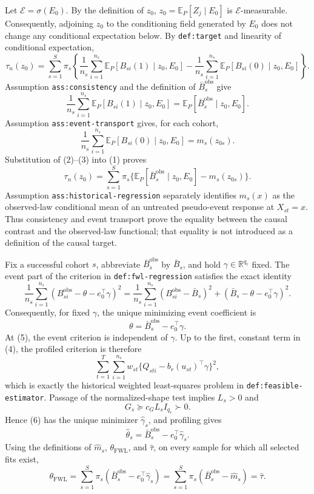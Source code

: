 Let \(\mathscr E=\sigma(E_0)\).  By the definition of \(z_0\),
\(z_0=\mathbb E_P[Z_j\mid E_0]\) is \(\mathscr E\)-measurable.  Consequently,
adjoining \(z_0\) to the conditioning field generated by \(E_0\) does not
change any conditional expectation below.  By \texttt{def:target} and
linearity of conditional expectation,
\[
\tau_n(z_0)=\sum_{s=1}^{S}\pi_s\left\{
\frac1{n_s}\sum_{i=1}^{n_s}\mathbb E_P[B_{si}(1)\mid z_0,E_0]
-\frac1{n_s}\sum_{i=1}^{n_s}\mathbb E_P[B_{si}(0)\mid z_0,E_0]
\right\}.
\tag{1}
\]
Assumption \texttt{ass:consistency} and the definition of
\(\bar B_s^{\mathrm{obs}}\) give
\[
\frac1{n_s}\sum_{i=1}^{n_s}\mathbb E_P[B_{si}(1)\mid z_0,E_0]
=\mathbb E_P[\bar B_s^{\mathrm{obs}}\mid z_0,E_0].
\tag{2}
\]
Assumption \texttt{ass:event-transport} gives, for each cohort,
\[
\frac1{n_s}\sum_{i=1}^{n_s}\mathbb E_P[B_{si}(0)\mid z_0,E_0]
=m_s(z_{0s}).
\tag{3}
\]
Substitution of (2)--(3) into (1) proves
\[
\tau_n(z_0)=\sum_{s=1}^{S}\pi_s
\{\mathbb E_P[\bar B_s^{\mathrm{obs}}\mid z_0,E_0]-m_s(z_{0s})\}.
\]
Assumption \texttt{ass:historical-regression} separately identifies
\(m_s(x)\) as the observed-law conditional mean of an untreated
pseudo-event response at \(X_{st}=x\).  Thus consistency and event transport
prove the equality between the causal contrast and the observed-law
functional; that equality is not introduced as a definition of the causal
target.

Fix a successful cohort \(s\), abbreviate
\(\bar B_s^{\mathrm{obs}}\) by \(\bar B_s\), and hold
\(\gamma\in\mathbb R^{q_r}\) fixed.  The event part of the criterion in
\texttt{def:fwl-regression} satisfies the exact identity
\[
\frac1{n_s}\sum_{i=1}^{n_s}
(B_{si}^{\mathrm{obs}}-\theta-e_0^\top\gamma)^2
=\frac1{n_s}\sum_{i=1}^{n_s}(B_{si}^{\mathrm{obs}}-\bar B_s)^2
+(\bar B_s-\theta-e_0^\top\gamma)^2.
\tag{4}
\]
Consequently, for fixed \(\gamma\), the unique minimizing event coefficient is
\[
\theta=\bar B_s^{\mathrm{obs}}-e_0^\top\gamma.
\tag{5}
\]
At (5), the event criterion is independent of \(\gamma\).  Up to the first,
constant term in (4), the profiled criterion is therefore
\[
\sum_{t=1}^{T}\sum_{i=1}^{n_s}
w_{st}\{Q_{sti}-b_r(u_{st})^\top\gamma\}^2,
\tag{6}
\]
which is exactly the historical weighted least-squares problem in
\texttt{def:feasible-estimator}.  Passage of the normalized-shape test implies
\(L_s>0\) and
\[
G_s\succeq c_GL_sI_{q_r}\succ0.
\]
Hence (6) has the unique minimizer \(\widehat\gamma_s\), and profiling gives
\[
\widehat\theta_s
=\bar B_s^{\mathrm{obs}}-e_0^\top\widehat\gamma_s.
\tag{7}
\]
Using the definitions of \(\widehat m_s\), \(\theta_{\mathrm{FWL}}\), and
\(\widehat\tau\), on every sample for which all selected fits exist,
\[
\theta_{\mathrm{FWL}}
=\sum_{s=1}^{S}\pi_s
(\bar B_s^{\mathrm{obs}}-e_0^\top\widehat\gamma_s)
=\sum_{s=1}^{S}\pi_s(\bar B_s^{\mathrm{obs}}-\widehat m_s)
=\widehat\tau.
\]

